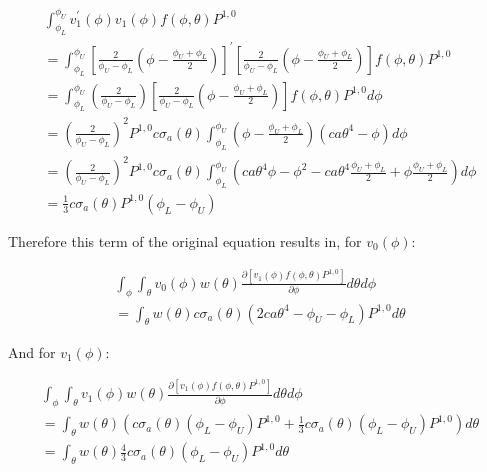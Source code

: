 \documentclass[12pt,a4paper,pagesize=pdftex]{scrartcl}
\begin{document}
\begin{multline*}
    \int_{\phi_L}^{\phi_U} v_1^\prime\left(\phi\right) v_1\left(\phi\right) f\left(\phi,\theta\right) P^{1,0} \\
    = \int_{\phi_L}^{\phi_U} \left[\frac{2}{\phi_U - \phi_L} \left(\phi - \frac{\phi_U + \phi_L}{2}\right)\right]^\prime \left[\frac{2}{\phi_U - \phi_L} \left(\phi - \frac{\phi_U + \phi_L}{2}\right) \right] f\left(\phi, \theta\right) P^{1,0} \\
    = \int_{\phi_L}^{\phi_U} \left(\frac{2}{\phi_U - \phi_L}\right)\left[\frac{2}{\phi_U - \phi_L} \left(\phi - \frac{\phi_U + \phi_L}{2}\right)\right] f\left(\phi, \theta\right) P^{1,0} d\phi \\
    = \left(\frac{2}{\phi_U - \phi_L}\right)^2 P^{1,0} c \sigma_a\left(\theta\right) \int_{\phi_L}^{\phi_U} \left(\phi - \frac{\phi_U + \phi_L}{2}\right) \left(c a \theta^4 - \phi\right) d \phi \\
    = \left(\frac{2}{\phi_U - \phi_L}\right)^2 P^{1,0} c \sigma_a\left(\theta\right) \int_{\phi_L}^{\phi_U} \left(c a \theta^4 \phi - \phi^2 - c a \theta^4 \frac{\phi_U + \phi_L}{2} + \phi \frac{\phi_U + \phi_L}{2}\right) d\phi \\
    = \frac{1}{3} c \sigma_a\left(\theta\right) P^{1,0} \left(\phi_L - \phi_U\right)
\end{multline*}

Therefore this term of the original equation results in, for \(v_0\left(\phi\right)\):

\begin{multline*}
    \int_\phi \int_\theta v_0\left(\phi\right) w\left(\theta\right) \frac{\partial \left[v_1\left(\phi\right) f\left(\phi, \theta\right) P^{1,0}\right]}{\partial \phi} d\theta d\phi \\
    = \int_\theta w\left(\theta\right) c \sigma_a\left(\theta\right) \left(2 c a \theta^4 - \phi_U - \phi_L\right) P^{1,0} d\theta
\end{multline*}

And for \(v_1\left(\phi\right)\):

\begin{multline*}
    \int_\phi \int_\theta v_1\left(\phi\right) w\left(\theta\right) \frac{\partial \left[v_1\left(\phi\right) f\left(\phi, \theta\right) P^{1,0}\right]}{\partial \phi} d\theta d\phi \\
    = \int_\theta w\left(\theta\right) \left(c \sigma_a\left(\theta\right) \left(\phi_L - \phi_U\right) P^{1,0} + \frac{1}{3} c \sigma_a\left(\theta\right)\left(\phi_L - \phi_U\right) P^{1,0}\right) d\theta \\
    = \int_\theta w\left(\theta\right) \frac{4}{3} c \sigma_a\left(\theta\right) \left(\phi_L - \phi_U\right) P^{1,0} d\theta
\end{multline*}
\end{document}
